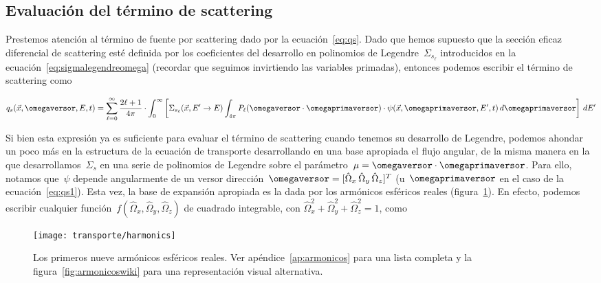 \subsection{Evaluación del término de scattering} %

Prestemos atención al término de fuente por scattering dado por la ecuación~\eqref{eq:qs}. Dado que hemos supuesto que la sección eficaz diferencial de scattering esté definida por los coeficientes del desarrollo en polinomios de Legendre~$\Sigma_{s_\ell}$ introducidos en la ecuación~\eqref{eq:sigmalegendreomega} (recordar que seguimos invirtiendo las variables primadas), entonces podemos escribir el término de scattering como

\begin{equation}
\label{eq:qs1}
q_s(\vec{x}, \omegaversor, E, t) =
 \sum_{\ell=0}^{\infty} \frac{ 2\ell + 1}{4\pi} \cdot
\int_{0}^{\infty} \left[ \Sigma_{s_\ell}(\vec{x}, E^{\prime} \rightarrow E) \int_{4\pi} P_\ell(\omegaversor \cdot \omegaprimaversor) \cdot \psi(\vec{x}, \omegaprimaversor, E^\prime,t)\, d\omegaprimaversor \right] \, dE^{\prime}
\end{equation}

Si bien esta expresión ya es suficiente para evaluar el término de scattering cuando tenemos su desarrollo de Legendre, podemos ahondar un poco más en la estructura de la ecuación de transporte desarrollando en una base apropiada el flujo angular, de la misma manera en la que desarrollamos~$\Sigma_s$ en una serie de polinomios de Legendre sobre el parámetro~$\mu = \omegaversor \cdot \omegaprimaversor$. Para ello, notamos que~$\psi$ depende angularmente de un versor dirección~$\omegaversor = [\hat\Omega_x \, \hat\Omega_y \, \hat\Omega_z]^T$ (u~$\omegaprimaversor$ en el caso de la ecuación~\eqref{eq:qs1}). Esta vez, la base de expansión apropiada es la dada por los armónicos esféricos reales (figura~\ref{fig:harmonics}). En efecto, podemos escribir cualquier función~$f(\hat\Omega_x, \hat\Omega_y, \hat\Omega_z)$ de cuadrado integrable, con $\hat\Omega_x^2 + \hat\Omega_y^2 + \hat\Omega_z^2 = 1$, como

\begin{figure}[t]
 \begin{center}
  \texttt{[image: transporte/harmonics]}
 \end{center}
\caption{\label{fig:harmonics}Los primeros nueve armónicos esféricos reales. Ver apéndice~\ref{ap:armonicos} para una lista completa y la figura~\ref{fig:armonicoswiki} para una representación visual alternativa.}
\end{figure}


